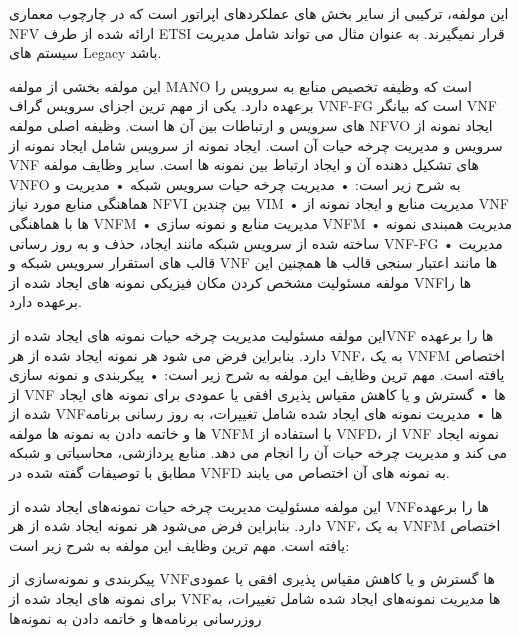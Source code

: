 
این مولفه، ترکیبی از سایر بخش های عملکردهای اپراتور است که در چارچوب معماری NFV ارائه شده از طرف ETSI قرار نمیگیرند. به عنوان مثال می تواند شامل مدیریت سیستم های Legacy باشد.


این مولفه بخشی از مولفه MANO است که وظیفه تخصیص منابع به سرویس را برعهده دارد. یکی از مهم ترین اجزای سرویس گراف VNF-FG است که بیانگر VNF های سرویس و ارتباطات بین آن ها است. وظیفه اصلی مولفه NFVO ایجاد نمونه از سرویس و مدیریت چرخه حیات آن است. ایجاد نمونه از سرویس شامل ایجاد نمونه از VNF های تشکیل دهنده آن و ایجاد ارتباط بین نمونه ها است. سایر وظایف مولفه VNFO به شرح زیر است:
    • مدیریت چرخه حیات سرویس شبکه
    • مدیریت و هماهنگی منابع مورد نیاز NFVI بین چندین VIM
    • مدیریت منابع و ایجاد نمونه از VNF ها با هماهنگی VNFM
    • مدیریت منابع و نمونه سازی VNFM
    • مدیریت همبندی نمونه ساخته شده از سرویس شبکه مانند ایجاد، حذف و به روز رسانی VNF-FG
    • مدیریت قالب های استقرار سرویس شبکه و VNF ها مانند اعتبار سنجی قالب ها
همچنین این مولفه مسئولیت مشخص کردن مکان فیزیکی نمونه های ایجاد شده از VNFها را برعهده دارد.


این مولفه مسئولیت مدیریت چرخه حیات نمونه های ایجاد شده ازVNF ها را برعهده دارد. بنابراین فرض می شود هر نمونه ایجاد شده از هر VNF، به یک VNFM اختصاص یافته است. مهم ترین وظایف این مولفه به شرح زیر است:
    • پیکربندی و نمونه سازی از VNF ها
    • گسترش و یا کاهش مقیاس پذیری افقی یا عمودی برای نمونه های ایجاد شده از VNFها
    • مدیریت نمونه های ایجاد شده شامل  تغییرات، به روز رسانی برنامه ها و خاتمه دادن به نمونه ها
مولفه VNFM با استفاده از VNFD، از VNF نمونه ایجاد می کند و مدیریت چرخه حیات آن را انجام می دهد. منابع پردازشی، محاسباتی و شبکه مطابق با توصیفات گفته شده در VNFD به نمونه های آن اختصاص می یابند.


این مولفه مسئولیت مدیریت چرخه حیات نمونه‌های ایجاد شده از VNFها را برعهده دارد. بنابراین فرض می‌شود هر نمونه ایجاد شده از هر VNF، به یک VNFM اختصاص یافته است.
مهم ترین وظایف این مولفه به شرح زیر است:


 پیکربندی و نمونه‌سازی از VNFها
 گسترش و یا کاهش مقیاس پذیری افقی یا عمودی برای نمونه های ایجاد شده از VNFها
 مدیریت نمونه‌های ایجاد شده شامل تغییرات، به روزرسانی برنامه‌ها و خاتمه دادن به نمونه‌ها

